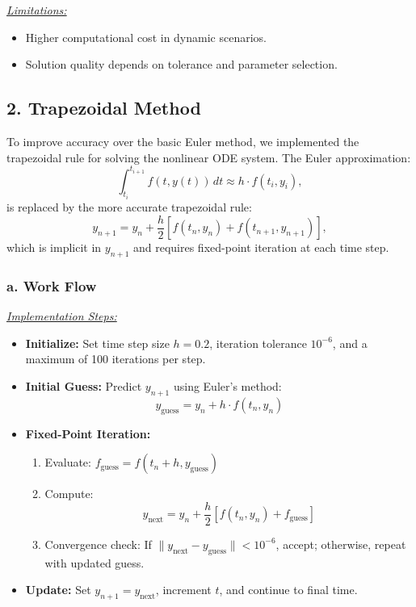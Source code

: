 \documentclass[journal]{IEEEtran}
\begin{document}
\vspace{0.5em}

\underline{\textit{Limitations:}}
\begin{itemize}
    \item Higher computational cost in dynamic scenarios.
    \item Solution quality depends on tolerance and parameter selection.
\end{itemize}

\subsection*{\textbf{2. Trapezoidal Method}}

To improve accuracy over the basic Euler method, we implemented the trapezoidal rule for solving the nonlinear ODE system. The Euler approximation:
\[
\int_{t_i}^{t_{i+1}} f(t, y(t)) \, dt \approx h \cdot f(t_i, y_i),
\]
is replaced by the more accurate trapezoidal rule:
\[
y_{n+1} = y_n + \frac{h}{2} \left[ f(t_n, y_n) + f(t_{n+1}, y_{n+1}) \right],
\]
which is implicit in \( y_{n+1} \) and requires fixed-point iteration at each time step.

\vspace{1em}

\subsubsection*{\textbf{a. Work Flow}} \hfill 

\underline{\textit{Implementation Steps:}}
\begin{itemize}
    \item \textbf{Initialize:} Set time step size \( h = 0.2 \), iteration tolerance \( 10^{-6} \), and a maximum of 100 iterations per step.
    \item \textbf{Initial Guess:} Predict \( y_{n+1} \) using Euler’s method:
    \[
    y_{\text{guess}} = y_n + h \cdot f(t_n, y_n)
    \]
    \item \textbf{Fixed-Point Iteration:}
    \begin{enumerate}
        \item Evaluate: \( f_{\text{guess}} = f(t_n + h, y_{\text{guess}}) \)
        \item Compute:
        \[
        y_{\text{next}} = y_n + \frac{h}{2} [f(t_n, y_n) + f_{\text{guess}}]
        \]
        \item Convergence check: If \( \|y_{\text{next}} - y_{\text{guess}}\| < 10^{-6} \), accept; otherwise, repeat with updated guess.
    \end{enumerate}
    \item \textbf{Update:} Set \( y_{n+1} = y_{\text{next}} \), increment \( t \), and continue to final time.
\end{itemize}
\vspace{0.5em}
\end{document}
